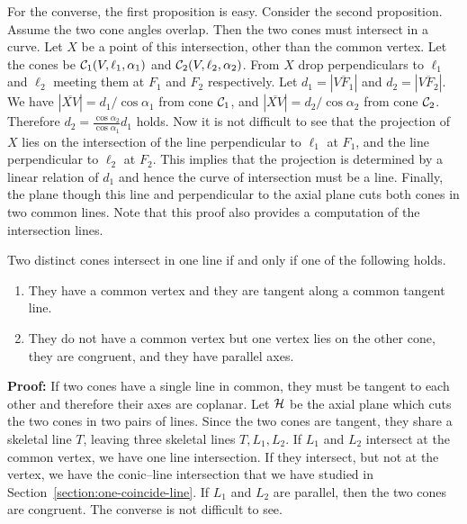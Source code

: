      For the converse, the first proposition is easy.  Consider the 
second proposition.  Assume the two cone angles overlap.  
Then the two cones must intersect in a curve.
Let $X$ be a point of this intersection, other
than the common vertex.  Let the cones be
${\cal C}_1(V,\ell_1,\alpha_1)$ and ${\cal C}_2(V,\ell_2,\alpha_2)$.
From $X$ drop 
perpendiculars to $\ell_1$ and $\ell_2$ meeting them at $F_1$ and $F_2$
respectively.  Let $d_1=|\overline{VF_1}|$ and $d_2=|\overline{VF_2}|$.
We have $|\overline{XV}|=d_1/\cos\alpha_1$ from cone ${\cal C}_1$,
and $|\overline{XV}|=d_2/\cos\alpha_2$ from cone ${\cal C}_2$.  Therefore
$d_2=\frac{\cos\alpha_2}{\cos\alpha_1}d_1$ holds.  Now it is not difficult
to see that the projection of $X$ lies on the intersection of the line
perpendicular to $\ell_1$ at $F_1$, and the line perpendicular to $\ell_2$ at
$F_2$.  This implies that the projection is determined by a linear relation of 
$d_1$ and hence the curve of intersection must be a line.  
Finally, the plane though this line and 
perpendicular to the axial plane cuts both cones in two common lines.  Note 
that this proof also provides a computation of the intersection 
lines.\ \ \ \QED

\begin{lemma}
\label{lemma:cone-cone-linear1}
     Two distinct cones intersect in one line if and only if one of the 
following holds.
\begin{enumerate}
     \item They have a common vertex and they are tangent along a common
          tangent line.
     \item They do not have a common vertex but one vertex lies on the other
          cone, they are congruent, and they
          have parallel axes.
\end{enumerate}
\end{lemma}
{\bf Proof:}  If two cones have a single line in common, they must be tangent 
to each other and therefore their axes are coplanar.  Let ${\cal H}$ be the 
axial plane which cuts the two cones in two pairs of lines.  Since the two 
cones are tangent, they share a skeletal line $T$, leaving three skeletal 
lines $T,L_1,L_2$.  If $L_1$ and $L_2$ intersect at the common vertex, we 
have one line intersection.  If they intersect, but not at the vertex, we have
the conic--line intersection that we have studied in
Section~\ref{section:one-coincide-line}.  If $L_1$ and $L_2$
are parallel, then the two cones are congruent.  The converse is not difficult
to see.\ \ \ \QED

